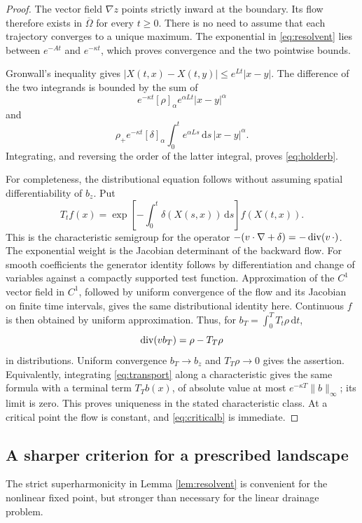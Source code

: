 \documentclass[11pt,a4paper]{article}
\theoremstyle{definition}\newtheorem{definition}[theorem]{Definition}
\theoremstyle{remark}\newtheorem{remark}[theorem]{Remark}
\newcommand{\dd}{\,\mathrm d}
\newcommand{\cl}{\overline}
\begin{document}
\begin{proof}
The vector field $\nabla z$ points strictly inward at the boundary. Its flow therefore exists in $\cl\Omega$ for every $t\geq0$. There is no need to assume that each trajectory converges to a unique maximum. The exponential in \eqref{eq:resolvent} lies between $e^{-At}$ and $e^{-\kappa t}$, which proves convergence and the two pointwise bounds.

Gronwall's inequality gives $|X(t,x)-X(t,y)|\leq e^{Lt}|x-y|$. The difference of the two integrands is bounded by the sum of
\[
 e^{-\kappa t}[\rho]_\alpha e^{\alpha Lt}|x-y|^\alpha
\]
and
\[
 \rho_+e^{-\kappa t}[\delta]_\alpha
 \int_0^t e^{\alpha Ls}\dd s\,|x-y|^\alpha.
\]
Integrating, and reversing the order of the latter integral, proves \eqref{eq:holderb}.

For completeness, the distributional equation follows without assuming spatial differentiability of $b_z$. Put
\[
 T_tf(x)=\exp\!\left[-\int_0^t\delta(X(s,x))\dd s\right]f(X(t,x)).
\]
This is the characteristic semigroup for the operator $-(v\cdot\nabla+\delta)=-\operatorname{div}(v\,\cdot)$. The exponential weight is the Jacobian determinant of the backward flow. For smooth coefficients the generator identity follows by differentiation and change of variables against a compactly supported test function. Approximation of the $C^1$ vector field in $C^1$, followed by uniform convergence of the flow and its Jacobian on finite time intervals, gives the same distributional identity here. Continuous $f$ is then obtained by uniform approximation. Thus, for $b_T=\int_0^T T_t\rho\dd t$,
\[
 \operatorname{div}(vb_T)=\rho-T_T\rho
\]
in distributions. Uniform convergence $b_T\to b_z$ and $T_T\rho\to0$ gives the assertion. Equivalently, integrating \eqref{eq:transport} along a characteristic gives the same formula with a terminal term $T_Tb(x)$, of absolute value at most $e^{-\kappa T}\|b\|_\infty$; its limit is zero. This proves uniqueness in the stated characteristic class. At a critical point the flow is constant, and \eqref{eq:criticalb} is immediate.
\end{proof}

\subsection{A sharper criterion for a prescribed landscape}
The strict superharmonicity in Lemma \ref{lem:resolvent} is convenient for the nonlinear fixed point, but stronger than necessary for the linear drainage problem.
\end{document}
